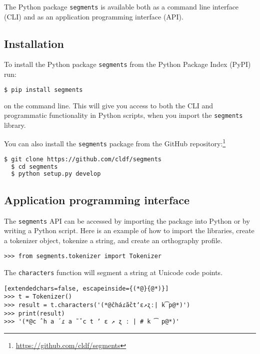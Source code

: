 \documentclass[output=inprep,
		biblatex
		]{LSP/langsci}\usepackage[]{graphicx}\usepackage[]{color}
\begin{document}
The Python package \texttt{segments} is available both as a command line interface (CLI) and as an application programming interface (API).

\subsection*{Installation}

To install the Python package \texttt{segments} from the Python Package Index (PyPI) run:

\begin{lstlisting}[language=bash]
  $ pip install segments
\end{lstlisting}

\noindent on the command line. This will give you access to both the CLI and programmatic functionality in Python scripts, when you import the \texttt{segments} library.

You can also install the \texttt{segments} package from the GitHub repository:\footnote{\url{https://github.com/cldf/segments}}

\begin{lstlisting}[language=bash]
  $ git clone https://github.com/cldf/segments
  $ cd segments
  $ python setup.py develop
\end{lstlisting}

\subsection*{Application programming interface}
The \texttt{segments} API can be accessed by importing the package into Python or by writing a Python script. Here is an example of how to import the libraries, create a tokenizer object, tokenize a string, and create an orthography profile.

\begin{lstlisting}
>>> from segments.tokenizer import Tokenizer
\end{lstlisting}

\noindent The \texttt{characters} function will segment a string at Unicode code points.

\begin{lstlisting}[extendedchars=false, escapeinside={(*@}{@*)}]
>>> t = Tokenizer()
>>> result = t.characters('(*@ĉháɾã̌ctʼɛ↗ʐː| k͡p@*)')
>>> print(result)
>>> '(*@c ̂ h a ́ ɾ a ̃ ̌ c t ʼ ɛ ↗ ʐ ː | # k ͡ p@*)'
\end{lstlisting}
\end{document}
